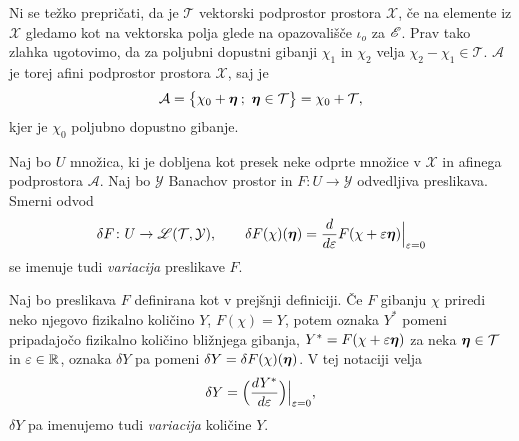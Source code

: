Ni se težko prepričati, da je $\mathcal{T}$ vektorski podprostor prostora $\mathcal{X}$, če na elemente iz $\mathcal{X}$
gledamo kot na vektorska polja glede na opazovališče $\iota_o$ za $\mathscr E$.
Prav tako zlahka ugotovimo, da za poljubni dopustni gibanji $\chi_1$ in $\chi_2$
velja $\chi_2-\chi_1\in\mathcal{T}$. $\mathcal{A}$ je torej afini podprostor prostora $\mathcal{X}$, saj je
\[ \mathcal{A}=\big\{ \chi_0+\boldsymbol \eta\: ;\ \boldsymbol \eta\in\mathcal{T} \big\}=\chi_0+\mathcal{T}, \]
kjer je $\chi_0$ poljubno dopustno gibanje.

\begin{definicija}
	Naj bo $U$ množica, ki je dobljena kot presek neke odprte množice v $\mathcal{X}$ in afinega
	podprostora $\mathcal{A}$. Naj bo $\mathcal{Y}$ Banachov prostor in $F\colon U\to\mathcal{Y}$
	odvedljiva preslikava. Smerni odvod
	\[
		\delta F\colon U\to\mathscr L(\mathcal{T},\mathcal{Y}),\qquad
		\delta F(\chi)(\boldsymbol \eta)=\frac{d}{d\varepsilon}F(\chi+\varepsilon\boldsymbol \eta)\Big|_{\varepsilon=0}
	\]
	se imenuje tudi \emph{variacija} preslikave $F$.
\end{definicija}

\begin{notacija}
	Naj bo preslikava $F$ definirana kot v prejšnji definiciji. Če $F$ gibanju $\chi$
	priredi neko njegovo fizikalno količino $Y$, $F(\chi)=Y$,
	potem oznaka $Y^*$ pomeni pripadajočo fizikalno količino bližnjega gibanja,
	$Y^*=F(\chi+\varepsilon\boldsymbol \eta)$ za neka $\boldsymbol \eta\in\mathcal{T}$ in $\varepsilon\in\mathbb R$,
	oznaka $\delta Y$ pa pomeni $\delta Y=\delta F(\chi)(\boldsymbol \eta)$. V tej notaciji velja
	\[ \delta Y = \Big(\frac{dY^*}{d\varepsilon}\Big)\Big|_{\varepsilon=0}, \]
	$\delta Y$ pa imenujemo tudi \emph{variacija} količine $Y$.
\end{notacija}

